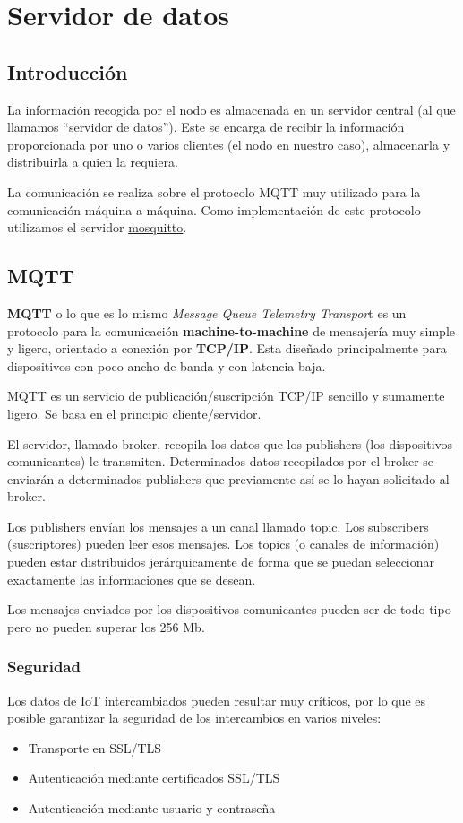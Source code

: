 \cleardoublepage

\chapter{Servidor de datos}
\label{makereference3}

\section{Introducción}
\label{makereference3.1}
La información recogida por el nodo es almacenada en un servidor central (al que llamamos ``servidor de datos''). Este se encarga de recibir la información proporcionada por uno o varios clientes (el nodo en nuestro caso), almacenarla y distribuirla a quien la requiera.

La comunicación se realiza sobre el protocolo MQTT muy utilizado para la comunicación máquina a máquina. Como implementación de este protocolo utilizamos el servidor \href{https://mosquitto.org/}{mosquitto}.

\section{MQTT}
\label{makereference3.2}
\textbf{MQTT} o lo que es lo mismo \textit{Message Queue Telemetry Transpor}t es un protocolo para la comunicación \textbf{machine-to-machine} de mensajería muy simple y ligero, orientado a conexión por \textbf{TCP/IP}. Esta diseñado principalmente para dispositivos con poco ancho de banda y con latencia baja.

MQTT es un servicio de publicación/suscripción TCP/IP sencillo y sumamente ligero. Se basa en el principio cliente/servidor.

El servidor, llamado broker, recopila los datos que los publishers (los dispositivos comunicantes) le transmiten. Determinados datos recopilados por el broker se enviarán a determinados publishers que previamente así se lo hayan solicitado al broker.

Los publishers envían los mensajes a un canal llamado topic. Los subscribers (suscriptores) pueden leer esos mensajes. Los topics (o canales de información) pueden estar distribuidos jerárquicamente de forma que se puedan seleccionar exactamente las informaciones que se desean.

Los mensajes enviados por los dispositivos comunicantes pueden ser de todo tipo pero no pueden superar los 256 Mb.

\subsection{Seguridad}
Los datos de IoT intercambiados pueden resultar muy críticos, por lo que es posible garantizar la seguridad de los intercambios en varios niveles:
\begin{itemize}
\item Transporte en SSL/TLS
\item Autenticación mediante certificados SSL/TLS
\item Autenticación mediante usuario y contraseña
\end{itemize}

